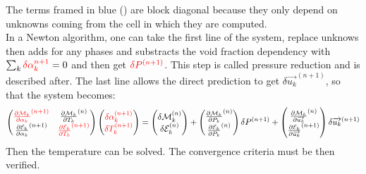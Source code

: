 The terms framed in blue () are block diagonal because they only depend on unknowns coming from the cell in which they are computed.\\
In a Newton algorithm, one can take the first line of the system, replace unknows then adds for any phases and substracts the void fraction dependency with $\sum_k  {\color{red} \delta\alpha_k^{n+1}}=0$ and then get ${\color{red}\delta P^{(n+1)}}$. This step is called pressure reduction and is described after. The last line allows the direct prediction to get $\delta \overrightarrow{u_k}^{(n+1)}$, so that the system becomes: 
\begin{equation}
\begin{pmatrix}
{\color{red}\frac{\partial \mathcal{M}_k}{\partial \alpha_k}^{(n+1)}} & \frac{\partial \mathcal{M}_k}{\partial T_k}^{(n)} \\
{\frac{\partial \mathcal{E}_k}{\partial \alpha_k}^{(n+1)}} & {\color{red}\frac{\partial \mathcal{E}_k}{\partial T_k}^{(n+1)}} \end{pmatrix}\begin{pmatrix}
{\color{red} \delta\alpha_k ^{(n+1)}}\\
{\color{red} \delta T_k^{(n+1)}}
\end{pmatrix}=\begin{pmatrix}
\delta\mathcal{M}_k^{(n)} \\
\delta\mathcal{E}_k^{(n)}
\end{pmatrix}+\begin{pmatrix}
\frac{\partial \mathcal{M}_k}{\partial P_k}^{(n)} \\
\frac{\partial \mathcal{E}_k}{\partial P_k}^{(n)}
\end{pmatrix}\delta P^{(n+1)}+
\begin{pmatrix}
\frac{\partial \mathcal{M}_k}{\partial \overrightarrow{u_k}}^{(n)} \\
\frac{\partial \mathcal{E}_k}{\partial \overrightarrow{u_k}}^{(n+1)}
\end{pmatrix}\delta \overrightarrow{u_k}^{(n+1)}
\end{equation}
Then the temperature can be solved. The convergence criteria must be then verified. 

